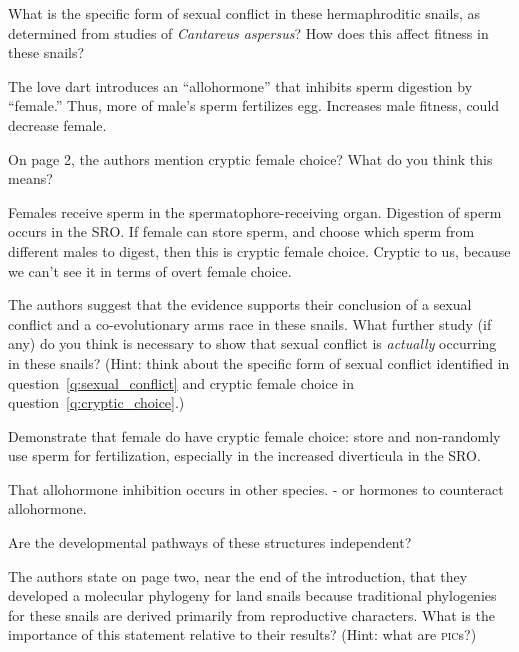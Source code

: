 \documentclass[12pt]{exam}
\begin{document}
\begin{questions}
\question[5]
\label{q:sexual_conflict}What is the specific form of sexual conflict in these hermaphroditic
  snails, as determined from studies of \emph{Cantareus aspersus}? How
  does this affect fitness in these snails?

\ifprintanswers\begin{solution}
The love dart introduces an “allohormone” that inhibits sperm digestion by “female.”  Thus, more of male’s sperm fertilizes egg.  Increases male fitness, could decrease female.
\end{solution}
\else{}
\fi

\question[5]
\label{q:cryptic_choice}On page 2, the authors mention cryptic female choice? What do you
  think this means?

\ifprintanswers\begin{solution}
Females receive sperm in the spermatophore-receiving organ.  Digestion of sperm occurs in the SRO.  If female can store sperm, and choose which sperm from different males to digest, then this is cryptic female choice.  Cryptic to us, because we can’t see it in terms of overt female choice.
\end{solution}
\else
\fi

\question[7]
The authors suggest that the evidence supports their conclusion of a
  sexual conflict and a co-evolutionary arms race in these snails. What
  further study (if any) do you think is necessary to show that sexual
  conflict is \emph{actually} occurring in these snails? (Hint: think about the
  specific form of sexual conflict identified in question~\ref{q:sexual_conflict}  and cryptic female
  choice in question~\ref{q:cryptic_choice}.)

\ifprintanswers\begin{solution}
Demonstrate that female do have cryptic female choice:  store and non-randomly use sperm for fertilization, especially in the increased diverticula in the SRO.

That allohormone inhibition occurs in other species. - or hormones to counteract allohormone.

Are the developmental pathways of these structures independent?
\end{solution}
\else{}
\fi

\bonusquestion[2]
The authors state on page two, near the
end of the introduction, that they developed a molecular phylogeny for
land snails because traditional phylogenies for these snails are derived
primarily from reproductive characters. What is the importance of this
statement relative to their results? (Hint: what are \textsc{pic}s?)


\end{questions}
\end{document}
